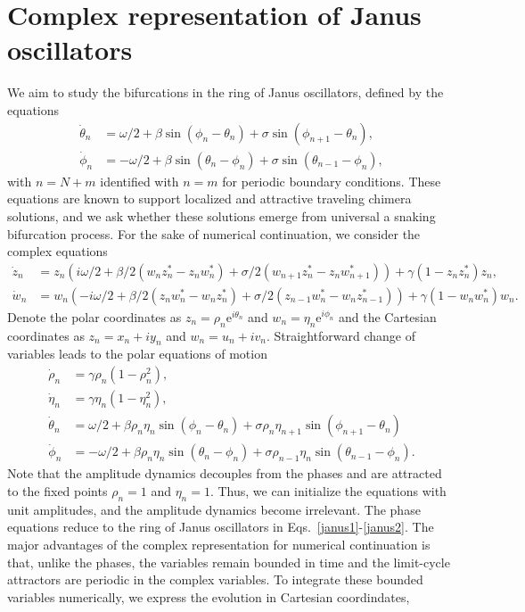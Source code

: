 \documentclass[aps,pre,amsmath,amssymb,floatfix,onecolumn,notitlepage,10pt]{revtex4-1}
\begin{document}
\section{Complex  representation of Janus oscillators}
We aim to study the bifurcations in the ring of Janus oscillators, defined by the equations
\begin{align}
\dot{\theta}_n &= \omega/2 + \beta\sin(\phi_n - \theta_n) + \sigma \sin(\phi_{n+1}-\theta_n), \label{janus1}\\
\dot{\phi}_n &= -\omega/2 + \beta\sin(\theta_n - \phi_n) + \sigma \sin(\theta_{n-1}-\phi_n), \label{janus2}
\end{align}
with $n=N+m$ identified with $n=m$ for periodic boundary conditions. These equations are known to support localized and attractive traveling chimera solutions, and we ask whether these solutions emerge from universal a snaking bifurcation process.
For the sake of numerical continuation, we consider the complex equations
\begin{align}
\dot z_n &= z_n\left( i\omega/2 + \beta/2\left(w_nz_n^*-z_nw_n^*\right) + \sigma/2\left(w_{n+1}z_n^*-z_nw_{n+1}^*\right)\right) + \gamma\left(1-z_nz_n^*\right)z_n, \label{eom1} \\
\dot w_n &= w_n\left( -i\omega/2 + \beta/2\left(z_nw_n^*-w_nz_n^*\right) + \sigma/2\left(z_{n-1}w_n^*-w_nz_{n-1}^*\right)\right) + \gamma\left(1-w_nw_n^*\right)w_n. \label{eom2}
\end{align}
Denote the polar coordinates as $z_n = \rho_n{\mathrm e}^{i\theta_n}$ and $w_n = \eta_n{\mathrm e}^{i\phi_n}$ and the Cartesian coordinates as $z_n = x_n + iy_n$ and $w_n = u_n+iv_n$. Straightforward change of variables leads to the polar equations of motion
\begin{align}
\dot \rho_n &= \gamma \rho_n \left(1-\rho_n^2\right), \\
\dot \eta_n &=  \gamma \eta_n \left(1-\eta_n^2\right),  \\
\dot \theta_n &= \omega/2 + \beta \rho_n \eta_n \sin\left(\phi_n-\theta_n\right) + \sigma \rho_n\eta_{n+1}\sin\left(\phi_{n+1}-\theta_n\right)\\
\dot \phi_n &= -\omega/2 + \beta \rho_n \eta_n \sin\left(\theta_n-\phi_n\right) + \sigma \rho_{n-1} \eta_n\sin\left(\theta_{n-1}-\phi_n\right).
\end{align}
Note that the amplitude dynamics decouples from the phases and are attracted to the fixed points $\rho_n=1$ and $\eta_n=1$.  Thus, we can initialize the equations with unit amplitudes, and the amplitude dynamics become irrelevant.  The phase equations reduce to the ring of Janus oscillators in Eqs.~\eqref{janus1}-\eqref{janus2}. The major advantages of the complex representation for numerical continuation is that, unlike the phases, the variables remain bounded in time and the limit-cycle attractors are periodic in the complex variables.  To integrate these bounded variables numerically, we express the evolution in Cartesian coordindates,
\end{document}
